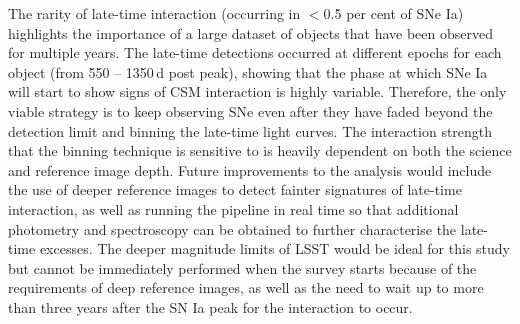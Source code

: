 \documentclass[a4paper,oneside,12pt, class=Latex/Classes/PhDthesisPSnPDF, crop=false]{standalone}
\begin{document}
The rarity of late-time interaction (occurring in $<$0.5 per cent of SNe Ia) highlights the importance of a large dataset of objects that have been observed for multiple years. The late-time detections occurred at different epochs for each object (from 550 -- 1350\,d post peak), showing that the phase at which SNe Ia will start to show signs of CSM interaction is highly variable. Therefore, the only viable strategy is to keep observing SNe even after they have faded beyond the detection limit and binning the late-time light curves. The interaction strength that the binning technique is sensitive to is heavily dependent on both the science and reference image depth. Future improvements to the analysis would include the use of deeper reference images to detect fainter signatures of late-time interaction, as well as running the pipeline in real time so that additional photometry and spectroscopy can be obtained to further characterise the late-time excesses. The deeper magnitude limits of LSST would be ideal for this study but cannot be immediately performed when the survey starts because of the requirements of deep reference images, as well as the need to wait up to more than three years after the SN Ia peak for the interaction to occur. 


\end{document}
